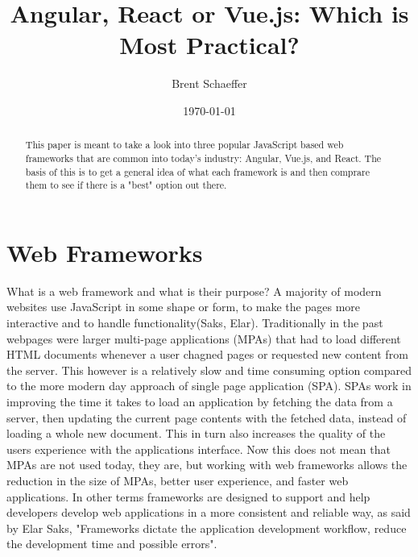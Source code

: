 \documentclass[11pt]{article}
\title{Angular, React or Vue.js: Which is Most Practical?}
\author{Brent Schaeffer}
\date{\today}
\begin{document}
\maketitle

\begin{abstract}
    This paper is meant to take a look into three popular JavaScript based web frameworks that are common into today's industry:
    Angular, Vue.js, and React. The basis of this is to get a general idea of what each framework is and then comprare them to see
    if there is a "best" option out there.
\end{abstract}

\section{Web Frameworks}
What is a web framework and what is their purpose?
A majority of modern websites use JavaScript in some shape or form, to make the pages more
interactive and to handle functionality(Saks, Elar)\cite{saks2019javascript}. Traditionally in the past webpages were larger multi-page applications (MPAs)
that had to load different HTML documents whenever a user chagned pages or requested new content from the server.
This however is a relatively slow and time consuming option compared to the more modern day approach of single page application
(SPA). SPAs work in improving the time it takes to load an application by fetching the data from a server, 
then updating the current page contents with the fetched data, instead of loading a whole new document. 
This in turn also increases the quality of the users experience with the applications interface. Now this does not mean
that MPAs are not used today, they are, but working with web frameworks allows the reduction in the size of MPAs, better user experience,
and faster web applications. In other terms frameworks are designed to support and help developers develop web applications
in a more consistent and reliable way, as said by Elar Saks, "Frameworks dictate the application development workflow, reduce the development time and
possible errors". 
\end{document}
